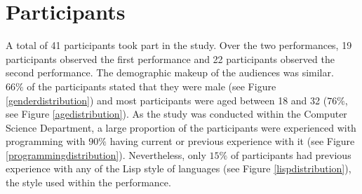 


\section{Participants}

A total of 41 participants took part in the study. Over the two performances, 19 participants observed the first performance and 22 participants observed the second performance. The demographic makeup of the audiences was similar.\\

$66\%$ of the participants stated that they were male (see Figure \ref{genderdistribution}) and most participants were aged between 18 and 32 ($76\%$, see Figure \ref{agedistribution}). As the study was conducted within the Computer Science Department, a large proportion of the participants were experienced with programming with $90\%$ having current or previous experience with it (see Figure \ref{programmingdistribution}). Nevertheless, only $15\%$ of participants had previous experience with any of the Lisp style of languages (see Figure \ref{lispdistribution}), the style used within the performance.\\

